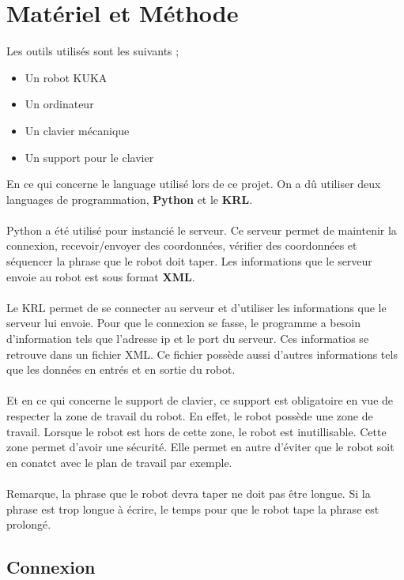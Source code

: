 \section{Matériel et Méthode}

Les outils utilisés sont les suivants ;

\begin{itemize}
    \item Un robot KUKA
    \item Un ordinateur
    \item Un clavier mécanique
    \item Un support pour le clavier
\end{itemize}

En ce qui concerne le language utilisé lors de ce projet.
On a dû utiliser deux languages de programmation, \textbf{Python} et le \textbf{KRL}.
\\
\\
Python a été utilisé pour instancié le serveur.
Ce serveur permet de maintenir la connexion, recevoir/envoyer des coordonnées, vérifier des coordonnées et séquencer la phrase que le robot doit taper.
Les informations que le serveur envoie au robot est sous format \textbf{XML}.
\\
\\
Le KRL permet de se connecter au serveur et d'utiliser les informations que le serveur lui envoie.
Pour que le connexion se fasse, le programme a besoin d'information tels que l'adresse ip et le port du serveur.
Ces informatios se retrouve dans un fichier XML.
Ce fichier possède aussi d'autres informations tels que les données en entrés et en sortie du robot.
\\
\\
Et en ce qui concerne le support de clavier, ce support est obligatoire en vue de respecter la zone de travail du robot.
En effet, le robot possède une zone de travail.
Lorsque le robot est hors de cette zone, le robot est inutillisable.
Cette zone permet d'avoir une sécurité.
Elle permet en autre d'éviter que le robot soit en conatct avec le plan de travail par exemple.
\\
\\
Remarque, la phrase que le robot devra taper ne doit pas être longue.
Si la phrase est trop longue à écrire, le temps pour que le robot tape la phrase est prolongé.

\subsection{Connexion}

